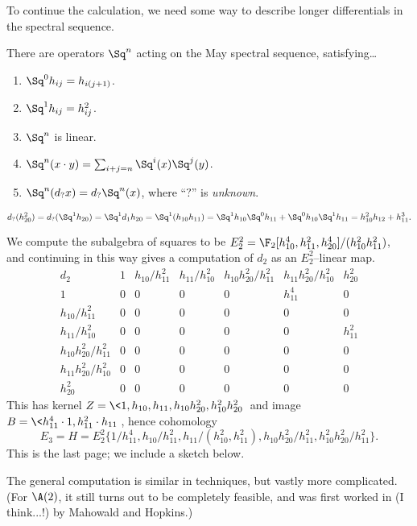 To continue the calculation, we need some way to describe longer differentials in the spectral sequence.

\begin{theorem}[Nakamura]
There are operators $\Sq^n$ acting on the May spectral sequence, satisfying\ldots
\begin{enumerate}
    \item $\Sq^0 h_{ij} = h_{i(j+1)}$.
    \item $\Sq^1 h_{ij} = h_{ij}^2$.
    \item $\Sq^n$ is linear.
    \item $\Sq^n(x \cdot y) = \sum_{i+j=n} \Sq^i(x) \Sq^j(y)$.
    \item $\Sq^n(d_? x) = d_? \Sq^n(x)$, where ``$?$'' is \emph{unknown}.
\end{enumerate}
\end{theorem}

\begin{example}
\[d_?(h_{20}^2) = d_?(\Sq^1 h_{20}) = \Sq^1 d_1 h_{20} = \Sq^1(h_{10} h_{11}) = \Sq^1 h_{10} \Sq^0 h_{11} + \Sq^0 h_{10} \Sq^1 h_{11} = h_{10}^2 h_{12} + h_{11}^3.\]
\end{example}

We compute the subalgebra of squares to be $E_2^2 = \F_2[h_{10}^4, h_{11}^2, h_{20}^4] / (h_{10}^2 h_{11}^2)$, and continuing in this way gives a computation of $d_2$ as an $E_2^2$--linear map.
\[
\begin{array}{c|cccccc}
d_2 & 1 & h_{10}/h_{11}^2 & h_{11}/h_{10}^2 & h_{10}h_{20}^2/h_{11}^2 & h_{11}h_{20}^2/h_{10}^2 & h_{20}^2 \\
1 &                       0 & 0 & 0 & 0 & h_{11}^4 & 0 \\
h_{10}/h_{11}^2 &         0 & 0 & 0 & 0 &        0 & 0 \\
h_{11}/h_{10}^2 &         0 & 0 & 0 & 0 &        0 & h_{11}^2 \\
h_{10}h_{20}^2/h_{11}^2 & 0 & 0 & 0 & 0 &        0 & 0 \\
h_{11}h_{20}^2/h_{10}^2 & 0 & 0 & 0 & 0 &        0 & 0 \\
h_{20}^2                & 0 & 0 & 0 & 0 &        0 & 0               
\end{array}
\]
This has kernel $Z = \<1, h_{10}, h_{11}, h_{10}h_{20}^2, h_{10}^2h_{20}^2\>$ and image $B = \<h_{11}^4 \cdot 1, h_{11}^2 \cdot h_{11}\>$, hence cohomology \[E_3 = H = E_2^2\{1 / h_{11}^4, h_{10}/h_{11}^2, h_{11} / (h_{10}^2, h_{11}^2), h_{10}h_{20}^2/h_{11}^2, h_{10}^2h_{20}^2 / h_{11}^2\}.\]  This is the last page; we include a sketch below.

The general computation is similar in techniques, but vastly more complicated.  (For $\A(2)$, it still turns out to be completely feasible, and was first worked in (I think...!) by Mahowald and Hopkins.)